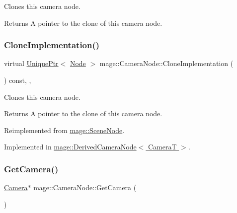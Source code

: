 Clones this camera node.

\begin{DoxyReturn}{Returns}
A pointer to the clone of this camera node. 
\end{DoxyReturn}
\hypertarget{classmage_1_1_camera_node_a002d3a2b41cda270a26ca5d8f3a17f55}{}\label{classmage_1_1_camera_node_a002d3a2b41cda270a26ca5d8f3a17f55} 
\subsubsection{\texorpdfstring{Clone\+Implementation()}{CloneImplementation()}}
{\footnotesize\ttfamily virtual \hyperlink{namespacemage_a8c307fbcc33bce9b7f2aa4c26c3b95cf}{Unique\+Ptr}$<$ \hyperlink{classmage_1_1_node}{Node} $>$ mage\+::\+Camera\+Node\+::\+Clone\+Implementation (\begin{DoxyParamCaption}{ }\end{DoxyParamCaption}) const\hspace{0.3cm}{\ttfamily [override]}, {\ttfamily [private]}, {}}

Clones this camera node.

\begin{DoxyReturn}{Returns}
A pointer to the clone of this camera node. 
\end{DoxyReturn}


Reimplemented from \hyperlink{classmage_1_1_scene_node_a42d0d53ab804d38ebd584d2de6490eeb}{mage\+::\+Scene\+Node}.



Implemented in \hyperlink{classmage_1_1_derived_camera_node_aa965751029ebd6b41d3805b499a8304e}{mage\+::\+Derived\+Camera\+Node$<$ Camera\+T $>$}.

\hypertarget{classmage_1_1_camera_node_aa9887e3bf192d6c078aae2430732cbf8}{}\label{classmage_1_1_camera_node_aa9887e3bf192d6c078aae2430732cbf8} 
\subsubsection{\texorpdfstring{Get\+Camera()}{GetCamera()}\hspace{0.1cm}{\footnotesize\ttfamily [1/2]}}
{\footnotesize\ttfamily \hyperlink{classmage_1_1_camera}{Camera}$\ast$ mage\+::\+Camera\+Node\+::\+Get\+Camera (\begin{DoxyParamCaption}{ }\end{DoxyParamCaption})\hspace{0.3cm}{\ttfamily [noexcept]}}

